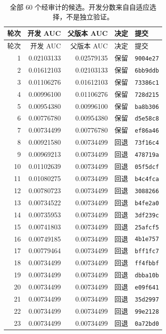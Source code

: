 \begin{longtable}{rrrll}
\caption{全部 60 个经审计的候选。开发分数来自自适应选择，不是独立验证。}\label{tab:alltrials}\\
\toprule 轮次 & 开发 AUC & 父版本 AUC & 决定 & 提交 \\ \midrule\endfirsthead
\toprule 轮次 & 开发 AUC & 父版本 AUC & 决定 & 提交 \\ \midrule\endhead
1 & 0.02103133 & 0.02579135 & 保留 & \texttt{9004e27} \\
2 & 0.01612103 & 0.02103133 & 保留 & \texttt{6bb9ddb} \\
3 & 0.01106276 & 0.01612103 & 保留 & \texttt{73386c1} \\
4 & 0.00996100 & 0.01106276 & 保留 & \texttt{728d215} \\
5 & 0.00954380 & 0.00996100 & 保留 & \texttt{ba8b306} \\
6 & 0.00776780 & 0.00954380 & 保留 & \texttt{d5e58c8} \\
7 & 0.00734499 & 0.00776780 & 保留 & \texttt{ef86a46} \\
8 & 0.00921580 & 0.00734499 & 回退 & \texttt{73f16c4} \\
9 & 0.00969213 & 0.00734499 & 回退 & \texttt{478719a} \\
10 & 0.01102639 & 0.00734499 & 回退 & \texttt{05f5dcf} \\
11 & 0.01080275 & 0.00734499 & 回退 & \texttt{b4c4fca} \\
12 & 0.00780723 & 0.00734499 & 回退 & \texttt{3088266} \\
13 & 0.00734522 & 0.00734499 & 回退 & \texttt{b4fe2a0} \\
14 & 0.00735953 & 0.00734499 & 回退 & \texttt{3df239c} \\
15 & 0.00741803 & 0.00734499 & 回退 & \texttt{25afcf5} \\
16 & 0.00749185 & 0.00734499 & 回退 & \texttt{4b1e757} \\
17 & 0.00779464 & 0.00734499 & 回退 & \texttt{bff1fc7} \\
18 & 0.00734499 & 0.00734499 & 回退 & \texttt{ff4fbbf} \\
19 & 0.00734499 & 0.00734499 & 回退 & \texttt{dbba10b} \\
20 & 0.00734499 & 0.00734499 & 回退 & \texttt{e09f641} \\
21 & 0.00734499 & 0.00734499 & 回退 & \texttt{35d2997} \\
22 & 0.00734499 & 0.00734499 & 回退 & \texttt{99e2128} \\
23 & 0.00734499 & 0.00734499 & 回退 & \texttt{0a72bd0} \\

\end{longtable}
